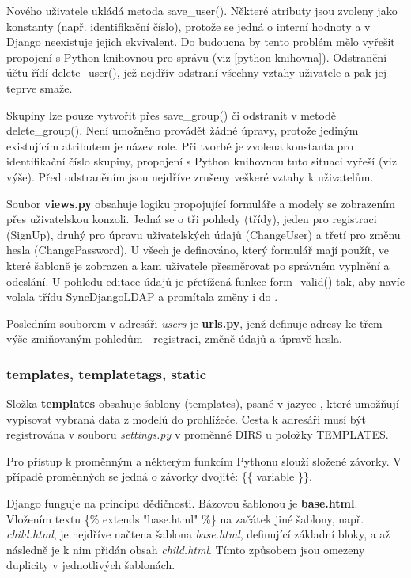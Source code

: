 Nového uživatele ukládá metoda \textsf{save\_user()}. Některé atributy
jsou zvoleny jako konstanty (např. identifikační číslo), protože se
jedná o interní hodnoty  a v Django neexistuje jejich
ekvivalent. Do budoucna by tento problém mělo vyřešit propojení s
Python knihovnou pro správu (viz \ref{python-knihovna}). Odstranění
účtu řídí \textsf{delete\_user()}, jež nejdřív odstraní všechny vztahy
uživatele a pak jej teprve smaže.

Skupiny lze pouze vytvořit přes \textsf{save\_group()} či odstranit v
metodě \textsf{delete\_group()}. Není umožněno provádět žádné úpravy,
protože jediným existujícím atributem je název role. Při tvorbě je
zvolena konstanta pro identifikační číslo skupiny, propojení s Python
knihovnou tuto situaci vyřeší (viz výše). Před odstraněním jsou
nejdříve zrušeny veškeré vztahy k uživatelům.
 
Soubor \textbf{views.py} obsahuje logiku propojující formuláře a
modely se zobrazením přes uživatelskou konzoli. Jedná se o tři pohledy
(třídy), jeden pro registraci (\textsf{SignUp}), druhý pro úpravu
uživatelských údajů (\textsf{ChangeUser}) a třetí pro změnu hesla
(\textsf{ChangePassword}). U všech je definováno, který formulář mají
použít, ve které šabloně je zobrazen a kam uživatele přesměrovat po
správném vyplnění a odeslání. U pohledu editace údajů je přetížená
funkce \textsf{form\_valid()} tak, aby navíc volala třídu
\textsf{SyncDjangoLDAP} a promítala změny i do .

Posledním souborem v adresáři \textit{users} je \textbf{urls.py}, jenž
definuje  adresy ke třem výše zmiňovaným pohledům -
registraci, změně údajů a úpravě hesla.

\subsubsection{templates, templatetags, static}
Složka \textbf{templates} obsahuje šablony (templates), psané v jazyce
, které umožňují vypisovat vybraná data z modelů do
prohlížeče. Cesta k adresáři musí být registrována v souboru
\textit{settings.py} v proměnné \textsf{DIRS} u položky
\textsf{TEMPLATES}.

Pro přístup k proměnným a některým funkcím Pythonu slouží složené
závorky. V případě proměnných se jedná o závorky dvojité: \textsf{\{\{
  variable \}\}}.

Django funguje na principu dědičnosti. Bázovou šablonou je
\textbf{base.html}. Vložením textu \textsf{\{\% extends "base.html"
  \%\}} na začátek jiné šablony, např. \textit{child.html}, je
nejdříve načtena šablona \textit{base.html}, definující základní
bloky, a až následně je k nim přidán obsah \textit{child.html}. Tímto
způsobem jsou omezeny duplicity v jednotlivých šablonách.

